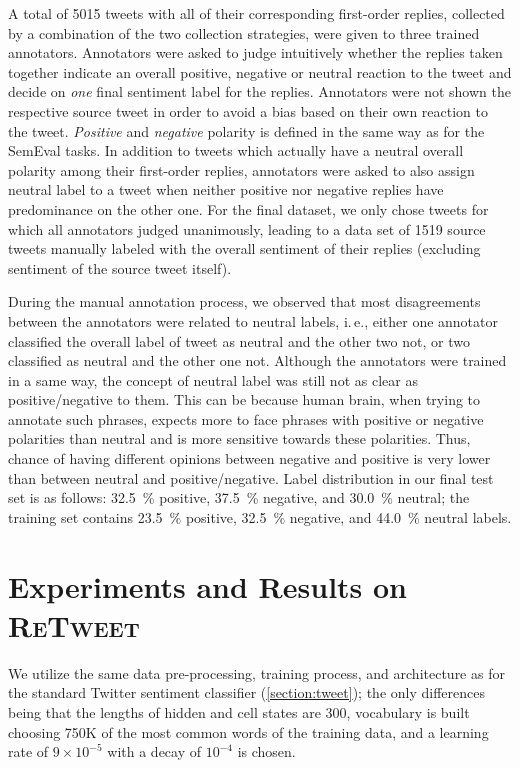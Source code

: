 \documentclass[conference]{IEEEtran}
\newcommand{\ie}{i.\,e.,\xspace}
\newcommand{\retweet}{\textsc{ReTweet}\xspace}
\begin{document}
A total of \num{5015} tweets with all of their corresponding first-order replies, collected by a combination of the two collection strategies, were given to three trained annotators. 
Annotators were asked to judge intuitively whether the replies taken together indicate an overall positive, negative or neutral reaction to the tweet and decide on \emph{one} final sentiment label for the replies.
Annotators were not shown the respective source tweet in order to avoid a bias based on their own reaction to the tweet.
\emph{Positive} and \emph{negative} polarity is defined in the same way as for the SemEval tasks.
In addition to tweets which actually have a neutral overall polarity among their first-order replies, annotators were asked to also assign neutral label to a tweet when neither positive nor negative replies have predominance on the other one.
For the final dataset, we only chose tweets for which all annotators judged unanimously, leading to a data set of \num{1519} source tweets manually labeled with the overall sentiment of their replies (excluding sentiment of the source tweet itself). 

During the manual annotation process, we observed that most disagreements between the annotators were related to neutral labels, \ie either one annotator classified the overall label of tweet as neutral and the other two not, or two classified as neutral and the other one not. Although the annotators were trained in a same way, the concept of neutral label was still not as clear as positive/negative to them. This can be because human brain, when trying to annotate such phrases, expects more to face phrases with positive or negative polarities than neutral and is more sensitive towards these polarities. Thus, chance of having different opinions between negative and positive is very lower than between neutral and positive/negative.
Label distribution in our final test set is as follows: \SI{32.5}{\percent} positive, \SI{37.5}{\percent} negative, and \SI{30.0}{\percent} neutral; the training set contains \SI{23.5}{\percent} positive, \SI{32.5}{\percent} negative, and \SI{44.0}{\percent} neutral labels.





\section{Experiments and Results on \retweet}
\label{section:Results}
We utilize the same data pre-processing, training process, and architecture as for the standard Twitter sentiment classifier (\cref{section:tweet}); the only differences being that the lengths of hidden and cell states are 300, vocabulary is built choosing 750K of the most common words of the training data, and a learning rate of $9\times10^{-5}$ with a decay of $10^{-4}$ is chosen.
\end{document}
